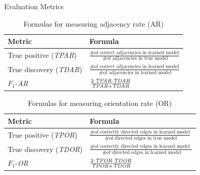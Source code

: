 \documentclass[hyperref={pdfpagelabels=false}]{beamer}
\begin{document}
\begin{frame}{Evaluation Metrics}
	\begin{table}%
		\centering
		\caption{Formulas for measuring adjacency rate (AR)}
		\begin{tabular}{@{}ll@{}}
			\hline
			Metric & Formula \\ %
			\hline
			True positive    (\emph{TPAR}) & $\frac{ \text{\# of correct adjacencies in learned model} } { \text{ \# of adjacencies in true model} }$  \\
			True discovery (\emph{TDAR}) &  $\frac{ \text{\# of correct adjacencies in learned model} } { \text{ \# of adjacencies in learned model} }$ \\
			$F_1$-\textit{AR} &  $\frac{2\cdot \text{\emph{TPAR}} \cdot \text{\emph{TDAR}}} {\text{\emph{TPAR}}+\text{\emph{TDAR}}}$  \\
			\hline
		\end{tabular}
	\end{table}
	\vspace{-1em}
	\begin{table}[ht]
		\centering
		\caption{Formulas for measuring orientation rate (OR)}
		\begin{tabular}{@{}ll@{}}
			\hline
			Metric & Formula \\ %
			\hline
			True positive  (\emph{TPOR}) & $\frac{ \text{\# of correctly directed edges in learned model} } {\text{ \# of directed edges in true model}}$  \\
			True discovery   (\emph{TDOR})& $\frac{ \text{\# of correctly directed edges in learned model } }{\text{ \# of directed edges in learned model}} $\\
			$F_1$-\textit{OR} &  $\frac{  2\cdot \text{\emph{TPOR}} \cdot \text{\emph{TDOR}} }{\text{\emph{TPOR}}+\text{\emph{TDOR}}}$ \\
			\hline
		\end{tabular}
	\end{table}
\end{frame}
\end{document}
